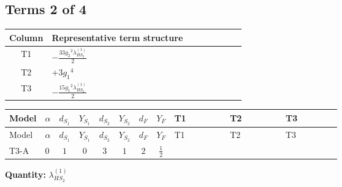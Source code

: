 \documentclass[8pt]{article}
\begin{document}
\begin{landscape}
\subsection*{Terms 2 of 4}
\begin{center}
\begin{tabular}{@{}c >{\raggedright\arraybackslash}p{0.82\linewidth}@{}}
\toprule
Column & Representative term structure \\
\midrule
T1 & \(\displaystyle -\frac{33 {g_2}^2 {\lambda_{HS_2}^{(1)}}}{2}\) \\
\midrule
T2 & \(\displaystyle +3 {g_1}^4\) \\
\midrule
T3 & \(\displaystyle -\frac{15 {g_1}^2 {\lambda_{HS_2}^{(1)}}}{2}\) \\
\midrule
\bottomrule
\end{tabular}
\end{center}
\smallskip
\tiny
\begin{longtable}{@{}llcccccc >{\raggedright\arraybackslash}p{0.21\linewidth} >{\raggedright\arraybackslash}p{0.21\linewidth} >{\raggedright\arraybackslash}p{0.21\linewidth}@{}}
\toprule
Model & $\alpha$ & $d_{S_1}$ & $Y_{S_1}$ & $d_{S_2}$ & $Y_{S_2}$ & $d_F$ & $Y_F$ & T1 & T2 & T3 \\
\midrule
\endfirsthead
\toprule
Model & $\alpha$ & $d_{S_1}$ & $Y_{S_1}$ & $d_{S_2}$ & $Y_{S_2}$ & $d_F$ & $Y_F$ & T1 & T2 & T3 \\
\midrule
\endhead
T3-A & $0$ & $1$ & $0$ & $3$ & $1$ & $2$ & $\frac{1}{2}$ & \scriptsize\adjustbox{max width=\linewidth}{$\begin{gathered} -\frac{33 {g_2}^2 {\lambda_{HS_2}^{(1)}}}{2}\end{gathered}$} & \scriptsize\adjustbox{max width=\linewidth}{$\begin{gathered} +3 {g_1}^4\end{gathered}$} & \scriptsize\adjustbox{max width=\linewidth}{$\begin{gathered} -\frac{15 {g_1}^2 {\lambda_{HS_2}^{(1)}}}{2}\end{gathered}$} \\
\midrule
\bottomrule
\end{longtable}
\clearpage
\noindent\textbf{Quantity: }$\lambda_{HS_2}^{(1)}$\par\smallskip

\end{landscape}
\end{document}
